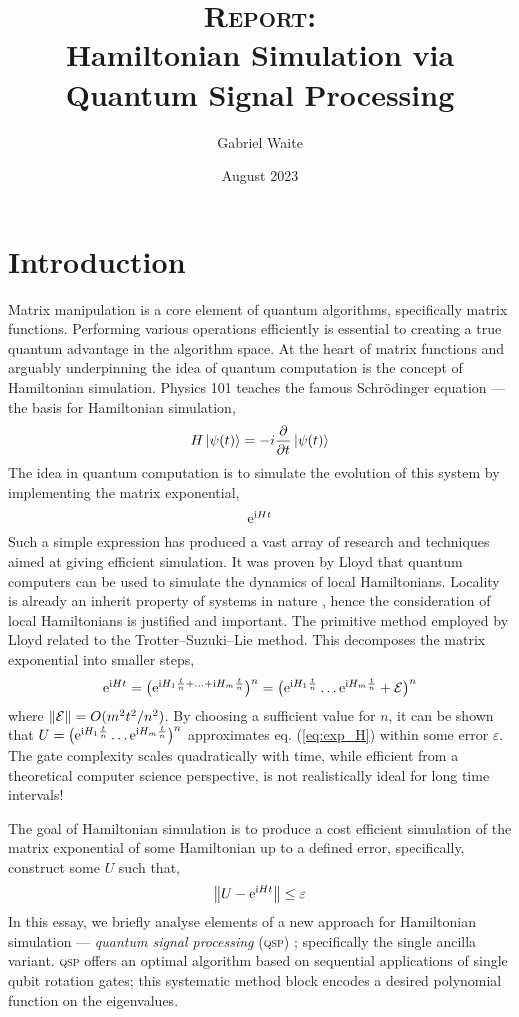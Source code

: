 \documentclass{article}
\title{\textsc{\textbf{Report:}}\\ Hamiltonian Simulation via \\ Quantum Signal Processing}
\author{Gabriel Waite}
\date{August 2023}
\begin{document}
\maketitle

\section{Introduction}
Matrix manipulation is a core element of quantum algorithms, specifically matrix functions. Performing various operations efficiently is essential to creating a true quantum advantage in the algorithm space. At the heart of matrix functions and arguably underpinning the idea of quantum computation \cite{Feynman82} is the concept of Hamiltonian simulation. Physics 101 teaches the famous Schrödinger equation --- the basis for Hamiltonian simulation,
\begin{equation}\label{eq:shcrodinger_eq}
    H\ket{\psi(t)} = -i\pdv{t}\ket{\psi(t)}
\end{equation}
The idea in quantum computation is to simulate the evolution of this system by implementing the matrix exponential,
\begin{equation}\label{eq:exp_H}
    \mathrm{e}^{\mathrm{i} Ht}
\end{equation}
Such a simple expression has produced a vast array of research and techniques aimed at giving efficient simulation. It was proven by Lloyd \cite{Lloyd1996} that quantum computers can be used to simulate the dynamics of local Hamiltonians. Locality is already an inherit property of systems in nature \cite{Ambainis14QMA,CN14}, hence the consideration of local Hamiltonians is justified and important. The primitive method employed by Lloyd related to the Trotter--Suzuki--Lie method. This decomposes the matrix exponential into smaller steps,
\begin{equation}
    \mathrm{e}^{\mathrm{i} Ht} = \big(\mathrm{e}^{\mathrm{i} H_1 \frac{t}{n} + \ldots + \mathrm{i} H_m \frac{t}{n}} \big)^n = \big(\mathrm{e}^{\mathrm{i} H_1 \frac{t}{n}}\ldots \mathrm{e}^{\mathrm{i} H_m \frac{t}{n}} + \mathcal{E} \big)^n
\end{equation}
where $\norm{\mathcal{E}} = O(m^2t^2/n^2)$. By choosing a sufficient value for $n$, it can be shown that $U = \big(\mathrm{e}^{\mathrm{i} H_1 \frac{t}{n}}\ldots \mathrm{e}^{\mathrm{i} H_m \frac{t}{n}}\big)^n$ approximates eq. (\ref{eq:exp_H}) within some error $\varepsilon$. The gate complexity scales quadratically with time, while efficient from a theoretical computer science perspective, is not realistically ideal for long time intervals!

The goal of Hamiltonian simulation is to produce a cost efficient simulation of the matrix exponential of some Hamiltonian up to a defined error, specifically, construct some $U$ such that,
\begin{equation}\label{eq:expH_norm}
    \norm{U - \mathrm{e}^{\mathrm{i} Ht}} \leq \varepsilon
\end{equation}
In this essay, we briefly analyse elements of a new approach for Hamiltonian simulation --- \emph{quantum signal processing} (\textsc{qsp}) \cite{LC17}; specifically the single ancilla variant. \textsc{qsp} offers an optimal algorithm based on sequential applications of single qubit rotation gates; this systematic method block encodes a desired polynomial function on the eigenvalues.
\end{document}
